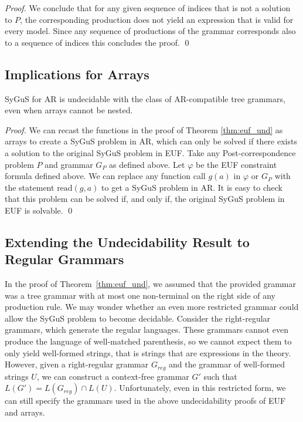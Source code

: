 \begin{proof}
We conclude that for any given sequence of indices that is not a solution to $P$, the corresponding production does not yield an expression that is valid for every model. 
Since any sequence of productions of the grammar corresponds also to a sequence of indices this concludes the proof. 
\qed
\end{proof}





\subsection{Implications for Arrays}


\begin{corollary}
     SyGuS for AR is undecidable with the class of AR-compatible tree grammars, even when arrays cannot be nested. 
    \label{cor:arr_und}
\end{corollary}
\begin{proof}
We can recast the functions in the proof of Theorem \ref{thm:euf_und} as arrays to create a SyGuS problem in AR, which can only be solved if there exists a solution to the original SyGuS problem in EUF.
Take any Post-correspondence problem $P$ and grammar $G_P$ as defined above.
Let $\varphi$ be the EUF constraint formula defined above. 
We can replace any function call $g(a)$ in $\varphi$ or $G_P$ with the statement $\text{read}(g,a)$ to get a SyGuS problem in AR.
It is easy to check that this problem can be solved if, and only if, the original SyGuS problem in EUF is solvable.
\qed
\end{proof}

\subsection{Extending the Undecidability Result to Regular Grammars}

In the proof of Theorem~\ref{thm:euf_und}, we assumed that the provided grammar was a tree grammar with at most one non-terminal on the right side of any production rule. 
We may wonder whether an even more restricted grammar could allow the SyGuS problem to become decidable. Consider the right-regular grammars, which generate the regular languages. 
These grammars cannot even produce the language of well-matched parenthesis, so we cannot expect them to only yield well-formed strings, that is strings that are expressions in the theory. 
However, given a right-regular grammar $G_{reg}$ and the grammar of well-formed strings $U$, we can construct a context-free grammar $G'$ such that $L(G') = L(G_{reg}) \cap L(U)$. 
Unfortunately, even in this restricted form, we can still specify the grammars used in the above undecidability proofs of EUF and arrays.

